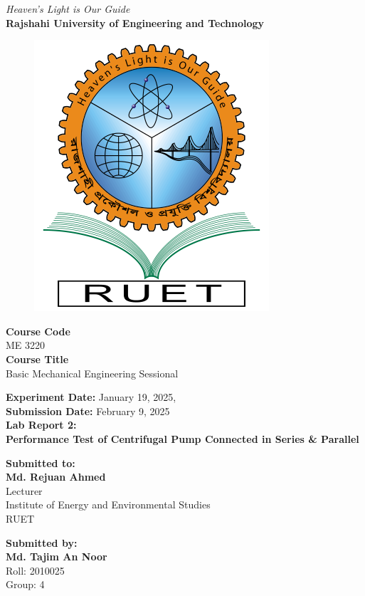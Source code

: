 \vspace*{\fill}
\begin{center}

    \emph{Heaven's Light is Our Guide} \\
    \textbf{Rajshahi University of Engineering and Technology} \\

    \begin{figure}[H]
        \centering
        \includegraphics[scale=.34]{images/RUET_logo.png}
        \label{fig:ruet_logo}
    \end{figure}
    \vspace{5mm}

    \textbf{Course Code}\\
    ME 3220\\
    \vspace{3mm}
    \textbf{Course Title}\\
    Basic Mechanical Engineering Sessional

    \vspace{5mm}
    \textbf{Experiment Date:} {January 19, 2025},\\
    \textbf{Submission Date:} {February 9, 2025}\\

    \vspace{5mm}
    \textbf{Lab Report 2: \\
        Performance Test of Centrifugal Pump Connected in Series \& Parallel}

    \vspace{10mm}

    \textbf{Submitted to:} \\
    \textbf{Md. Rejuan Ahmed} \\
    Lecturer \\
    Institute of Energy and Environmental Studies \\
    RUET
    \vspace{8mm}

    \textbf{Submitted by:} \\
    \textbf{Md. Tajim An Noor} \\
    Roll: 2010025\\
    Group: 4

\end{center}
\vspace*{\fill}
